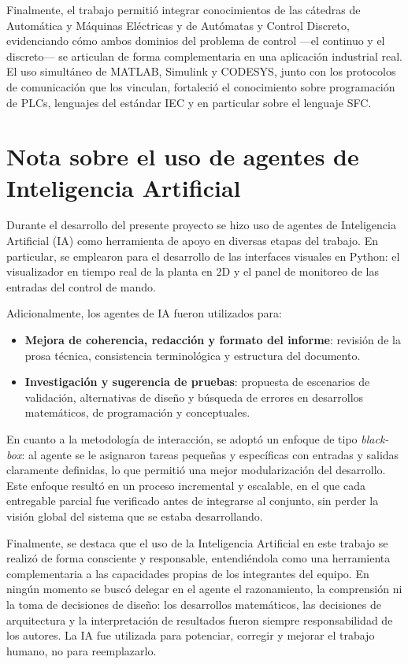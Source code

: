 \documentclass[12pt, a4paper]{article}
\begin{document}
Finalmente, el trabajo permitió integrar conocimientos de las cátedras de Automática
y Máquinas Eléctricas y de Autómatas y Control Discreto, evidenciando cómo ambos
dominios del problema de control ---el continuo y el discreto--- se articulan de forma
complementaria en una aplicación industrial real. El uso simultáneo de MATLAB,
Simulink y CODESYS, junto con los protocolos de comunicación que los vinculan,
fortaleció el conocimiento sobre programación de PLCs, lenguajes del estándar
IEC y en particular sobre el lenguaje SFC\@.

\newpage
\section{Nota sobre el uso de agentes de Inteligencia Artificial}

Durante el desarrollo del presente proyecto se hizo uso de agentes de Inteligencia
Artificial (IA) como herramienta de apoyo en diversas etapas del trabajo. En
particular, se emplearon para el desarrollo de las interfaces visuales en Python:
el visualizador en tiempo real de la planta en 2D y el panel de monitoreo de las
entradas del control de mando.

Adicionalmente, los agentes de IA fueron utilizados para:

\begin{itemize}
    \item \textbf{Mejora de coherencia, redacción y formato del informe}: revisión
    de la prosa técnica, consistencia terminológica y estructura del documento.

    \item \textbf{Investigación y sugerencia de pruebas}: propuesta de escenarios
    de validación, alternativas de diseño y búsqueda de errores en desarrollos
    matemáticos, de programación y conceptuales.
\end{itemize}

En cuanto a la metodología de interacción, se adoptó un enfoque de tipo
\textit{black-box}: al agente se le asignaron tareas pequeñas y específicas con
entradas y salidas claramente definidas, lo que permitió una mejor modularización
del desarrollo. Este enfoque resultó en un proceso incremental y escalable, en el
que cada entregable parcial fue verificado antes de integrarse al conjunto, sin
perder la visión global del sistema que se estaba desarrollando.

Finalmente, se destaca que el uso de la Inteligencia Artificial en este trabajo
se realizó de forma consciente y responsable, entendiéndola como una herramienta
complementaria a las capacidades propias de los integrantes del equipo. En ningún
momento se buscó delegar en el agente el razonamiento, la comprensión ni la toma
de decisiones de diseño: los desarrollos matemáticos, las decisiones de
arquitectura y la interpretación de resultados fueron siempre responsabilidad de
los autores. La IA fue utilizada para potenciar, corregir y mejorar el trabajo
humano, no para reemplazarlo.
\end{document}
